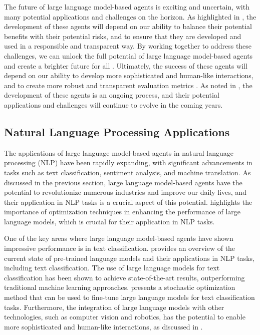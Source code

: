 \documentclass[11pt,a4paper]{article}
\begin{document}
The future of large language model-based agents is exciting and uncertain, with many potential applications and challenges on the horizon. As highlighted in \cite{doi:10.34133/research.0655}, the development of these agents will depend on our ability to balance their potential benefits with their potential risks, and to ensure that they are developed and used in a responsible and transparent way. By working together to address these challenges, we can unlock the full potential of large language model-based agents and create a brighter future for all \cite{arxiv:2404.01023}. Ultimately, the success of these agents will depend on our ability to develop more sophisticated and human-like interactions, and to create more robust and transparent evaluation metrics \cite{arxiv:2402.10172}. As noted in \cite{arxiv:2406.04151}, the development of these agents is an ongoing process, and their potential applications and challenges will continue to evolve in the coming years.


\subsection{Natural Language Processing Applications}


The applications of large language model-based agents in natural language processing (NLP) have been rapidly expanding, with significant advancements in tasks such as text classification, sentiment analysis, and machine translation. As discussed in the previous section, large language model-based agents have the potential to revolutionize numerous industries and improve our daily lives, and their application in NLP tasks is a crucial aspect of this potential. \cite{arxiv:2309.14365} highlights the importance of optimization techniques in enhancing the performance of large language models, which is crucial for their application in NLP tasks.

One of the key areas where large language model-based agents have shown impressive performance is in text classification. \cite{doi:10.1145/3605943} provides an overview of the current state of pre-trained language models and their applications in NLP tasks, including text classification. The use of large language models for text classification has been shown to achieve state-of-the-art results, outperforming traditional machine learning approaches. \cite{arxiv:1412.6980} presents a stochastic optimization method that can be used to fine-tune large language models for text classification tasks. Furthermore, the integration of large language models with other technologies, such as computer vision and robotics, has the potential to enable more sophisticated and human-like interactions, as discussed in \cite{arxiv:2401.13601}.
\end{document}
